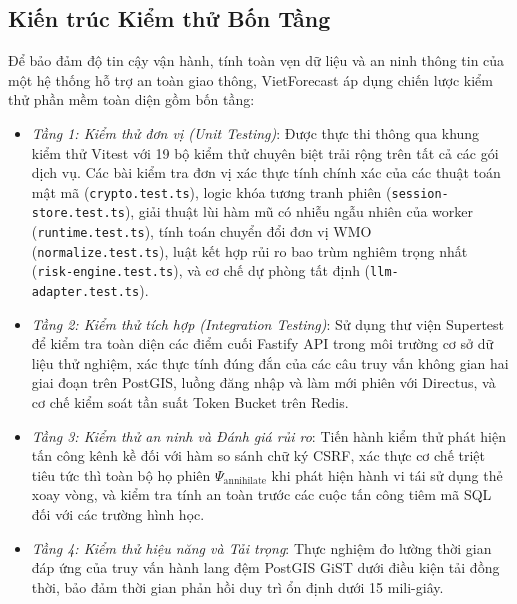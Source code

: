 \subsection{Kiến trúc Kiểm thử Bốn Tầng}
Để bảo đảm độ tin cậy vận hành, tính toàn vẹn dữ liệu và an ninh thông tin của một hệ thống hỗ trợ an toàn giao thông, VietForecast áp dụng chiến lược kiểm thử phần mềm toàn diện gồm bốn tầng:
\begin{itemize}
    \item[-] \textit{Tầng 1: Kiểm thử đơn vị (Unit Testing)}: Được thực thi thông qua khung kiểm thử Vitest với 19 bộ kiểm thử chuyên biệt trải rộng trên tất cả các gói dịch vụ. Các bài kiểm tra đơn vị xác thực tính chính xác của các thuật toán mật mã (\texttt{crypto.test.ts}), logic khóa tương tranh phiên (\texttt{session-store.test.ts}), giải thuật lùi hàm mũ có nhiễu ngẫu nhiên của worker (\texttt{runtime.test.ts}), tính toán chuyển đổi đơn vị WMO (\texttt{normalize.test.ts}), luật kết hợp rủi ro bao trùm nghiêm trọng nhất (\texttt{risk-engine.test.ts}), và cơ chế dự phòng tất định (\texttt{llm-adapter.test.ts}).
    \item[-] \textit{Tầng 2: Kiểm thử tích hợp (Integration Testing)}: Sử dụng thư viện Supertest để kiểm tra toàn diện các điểm cuối Fastify API trong môi trường cơ sở dữ liệu thử nghiệm, xác thực tính đúng đắn của các câu truy vấn không gian hai giai đoạn trên PostGIS, luồng đăng nhập và làm mới phiên với Directus, và cơ chế kiểm soát tần suất Token Bucket trên Redis.
    \item[-] \textit{Tầng 3: Kiểm thử an ninh và Đánh giá rủi ro}: Tiến hành kiểm thử phát hiện tấn công kênh kề đối với hàm so sánh chữ ký CSRF, xác thực cơ chế triệt tiêu tức thì toàn bộ họ phiên $\Psi_{\text{annihilate}}$ khi phát hiện hành vi tái sử dụng thẻ xoay vòng, và kiểm tra tính an toàn trước các cuộc tấn công tiêm mã SQL đối với các trường hình học.
    \item[-] \textit{Tầng 4: Kiểm thử hiệu năng và Tải trọng}: Thực nghiệm đo lường thời gian đáp ứng của truy vấn hành lang đệm PostGIS GiST dưới điều kiện tải đồng thời, bảo đảm thời gian phản hồi duy trì ổn định dưới 15 mili-giây.
\end{itemize}


